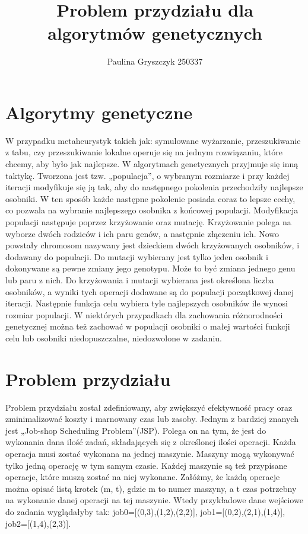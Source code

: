 \documentclass{article}
\title{Problem przydziału dla algorytmów genetycznych}
\author{Paulina Gryszczyk 250337}
\begin{document}
\maketitle
\newpage


\section{Algorytmy genetyczne}
W przypadku metaheurystyk takich jak: symulowane wyżarzanie, przeszukiwanie z tabu, czy przeszukiwanie lokalne operuje się na jednym rozwiązaniu, które chcemy, aby było jak najlepsze. W algorytmach genetycznych przyjmuje się inną taktykę. Tworzona jest tzw. „populacja”, o wybranym rozmiarze i przy każdej iteracji modyfikuje się ją tak, aby do następnego pokolenia przechodziły najlepsze osobniki. W ten sposób każde następne pokolenie posiada coraz to lepsze cechy, co pozwala na wybranie najlepszego osobnika z końcowej populacji. Modyfikacja populacji następuje poprzez krzyżowanie oraz mutację. Krzyżowanie polega na wyborze dwóch rodziców i ich paru genów, a następnie złączeniu ich. Nowo powstały chromosom nazywany jest dzieckiem dwóch krzyżowanych osobników, i dodawany do populacji. Do mutacji wybierany jest tylko jeden osobnik i dokonywane są pewne zmiany jego genotypu. Może to być zmiana jednego genu lub paru z nich. Do krzyżowania i mutacji wybierana jest określona liczba osobników, a wyniki tych operacji dodawane są do populacji początkowej danej iteracji. Następnie funkcja celu wybiera tyle najlepszych osobników ile wynosi rozmiar populacji. W niektórych przypadkach dla zachowania różnorodności genetycznej można też zachować w populacji osobniki o małej wartości funkcji celu lub osobniki niedopuszczalne, niedozwolone w zadaniu.

\section{Problem przydziału}
Problem przydziału został zdefiniowany, aby zwiększyć efektywność pracy oraz zminimalizować koszty i marnowany czas lub zasoby.
Jednym z bardziej znanych jest „Job-shop Scheduling Problem”(JSP). Polega on na tym, że jest do wykonania dana ilość zadań, składających się z określonej ilości operacji. Każda operacja musi zostać wykonana na jednej maszynie. Maszyny mogą wykonywać tylko jedną operację w tym samym czasie. Każdej maszynie są też przypisane operacje, które muszą zostać na niej wykonane. Załóżmy, że każdą operacje można opisać listą krotek (m, t), gdzie m to numer maszyny, a t czas potrzebny na wykonanie danej operacji na tej maszynie. Wtedy przykładowe dane wejściowe do zadania wyglądałyby tak:
job0=[(0,3),(1,2),(2,2)], job1=[(0,2),(2,1),(1,4)], job2=[(1,4),(2,3)].
\end{document}
